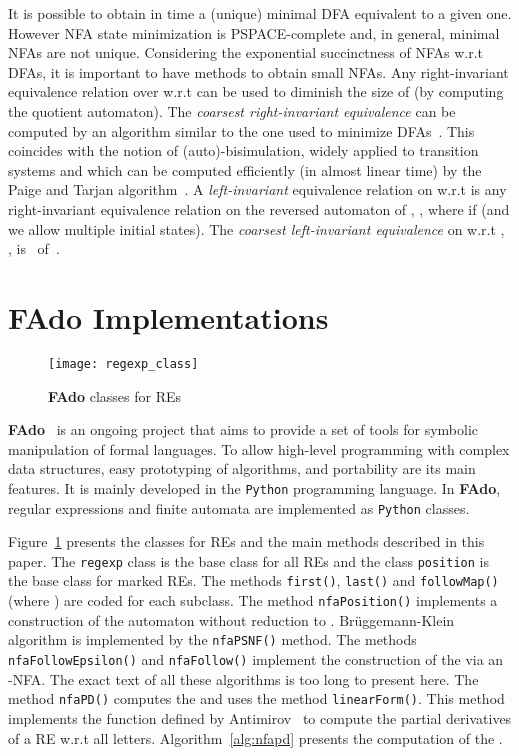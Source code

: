 \documentclass{llncs}
\newcommand{\FAdo}{{\bf FAdo}\xspace}
\newcommand{\dfa}{DFA\xspace}
\newcommand{\dfas}{DFAs\xspace}
\newcommand{\NFA}{NFA\xspace}
\newcommand{\nfas}{NFAs\xspace}
\newcommand{\re}{RE\xspace}
\newcommand{\res}{REs\xspace}
\newcommand{\python}{\texttt{Python}\xspace}
\newcommand{\snf}{\mbox{}\xspace}
\begin{document}
It is possible to obtain in time  a (unique)
minimal \dfa equivalent to a given one. However \NFA state minimization  is
PSPACE-complete and, in general, minimal \nfas are not unique.
Considering the exponential succinctness of \nfas w.r.t \dfas, it is
important to have methods to obtain small \nfas.  Any right-invariant
equivalence relation over  w.r.t  can be used to diminish
the size of  (by computing the quotient automaton). The
\emph{coarsest right-invariant equivalence}  can be computed
by an algorithm similar to the one used to minimize
\dfas~\cite{reduce_nfa}. This coincides with the notion of
(auto)-bisimulation, widely applied to transition systems and which
can be computed efficiently (in almost linear time) by the Paige and Tarjan
algorithm~\cite{tarjan87}. A \emph{left-invariant} equivalence relation on 
w.r.t  is any right-invariant equivalence relation on the
reversed automaton of ,
, where  if  (and we allow
multiple initial states). The \emph{coarsest left-invariant
  equivalence} on  w.r.t , , is  ~of~.
\section{\FAdo Implementations}
\label{sec:fado}
\begin{figure}
\vspace{-0.2cm}
\begin{center}
\texttt{[image: regexp\_class]}   
\end{center}
\vspace{-0.2cm}
\caption{\FAdo classes for \res}
\label{fig:regexpclass}
\vspace{-0.2cm}
\end{figure}

\FAdo~\cite{fado,moreira05_c:_inter_manip_regul_objec_fado,almeida09:_fado_guitar_c}
is an ongoing project that aims to provide a set of tools for symbolic
manipulation of formal languages. To allow high-level programming with
complex data structures, easy prototyping of algorithms, and
portability are its main features. It is mainly developed in the
\python programming language.  In \FAdo, regular expressions and
finite automata are implemented as \python classes.

Figure~\ref{fig:regexpclass} presents the classes for \res and the
main methods described in this paper.  The \texttt{regexp} class is
the base class for all \res and the class \texttt{position} is the
base class for marked \res. The methods \texttt{first()},
\texttt{last()} and \texttt{followMap()} (where
)
are coded for each subclass. The method \texttt{nfaPosition()}
implements a construction of the  automaton without
reduction to \snf. Brüggemann-Klein algorithm is implemented by the
\texttt{nfaPSNF()} method.  The methods \texttt{nfaFollowEpsilon()}
and \texttt{nfaFollow()} implement the construction of the  via
an -\NFA{}. The exact text of all these  algorithms is too long to present
here.  The method \texttt{nfaPD()} computes the  and uses
the method \texttt{linearForm()}. This method  implements the function
 defined by
Antimirov~\cite{antimirov96:_partial_deriv_regul_expres_finit_autom_const}
to compute the partial derivatives of a \re w.r.t all letters. 
Algorithm~\ref{alg:nfapd} presents the computation of the .
\end{document}
